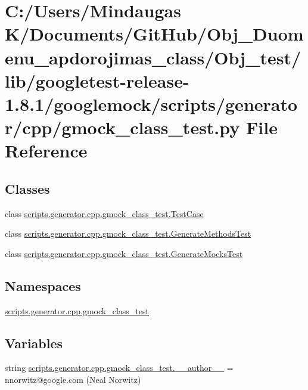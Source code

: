 \hypertarget{_obj__test_2lib_2googletest-release-1_88_81_2googlemock_2scripts_2generator_2cpp_2gmock__class__test_8py}{}\section{C\+:/\+Users/\+Mindaugas K/\+Documents/\+Git\+Hub/\+Obj\+\_\+\+Duomenu\+\_\+apdorojimas\+\_\+class/\+Obj\+\_\+test/lib/googletest-\/release-\/1.8.1/googlemock/scripts/generator/cpp/gmock\+\_\+class\+\_\+test.py File Reference}
\label{_obj__test_2lib_2googletest-release-1_88_81_2googlemock_2scripts_2generator_2cpp_2gmock__class__test_8py}
\subsection*{Classes}
\begin{DoxyCompactItemize}
\item 
class \mbox{\hyperlink{classscripts_1_1generator_1_1cpp_1_1gmock__class__test_1_1_test_case}{scripts.\+generator.\+cpp.\+gmock\+\_\+class\+\_\+test.\+Test\+Case}}
\item 
class \mbox{\hyperlink{classscripts_1_1generator_1_1cpp_1_1gmock__class__test_1_1_generate_methods_test}{scripts.\+generator.\+cpp.\+gmock\+\_\+class\+\_\+test.\+Generate\+Methods\+Test}}
\item 
class \mbox{\hyperlink{classscripts_1_1generator_1_1cpp_1_1gmock__class__test_1_1_generate_mocks_test}{scripts.\+generator.\+cpp.\+gmock\+\_\+class\+\_\+test.\+Generate\+Mocks\+Test}}
\end{DoxyCompactItemize}
\subsection*{Namespaces}
\begin{DoxyCompactItemize}
\item 
 \mbox{\hyperlink{namespacescripts_1_1generator_1_1cpp_1_1gmock__class__test}{scripts.\+generator.\+cpp.\+gmock\+\_\+class\+\_\+test}}
\end{DoxyCompactItemize}
\subsection*{Variables}
\begin{DoxyCompactItemize}
\item 
string \mbox{\hyperlink{namespacescripts_1_1generator_1_1cpp_1_1gmock__class__test_a0196eab512474f7397dab1f75f50f241}{scripts.\+generator.\+cpp.\+gmock\+\_\+class\+\_\+test.\+\_\+\+\_\+author\+\_\+\+\_\+}} = \textquotesingle{}nnorwitz@google.\+com (Neal Norwitz)\textquotesingle{}
\end{DoxyCompactItemize}
